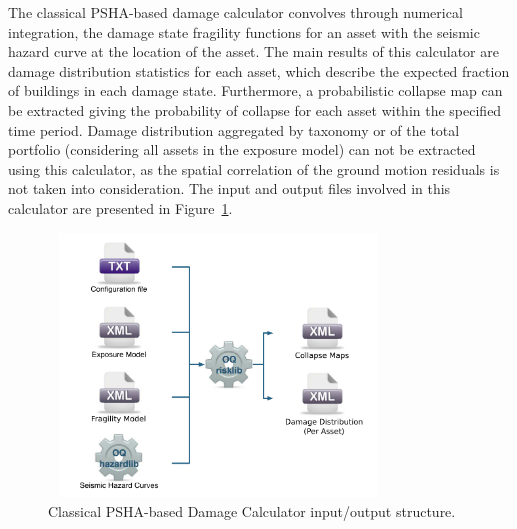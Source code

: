 The classical PSHA-based damage calculator convolves through numerical integration, the damage state fragility functions for an asset with the seismic hazard curve at the location of the asset. The main results of this calculator are damage distribution statistics for each asset, which describe the expected fraction of buildings in each damage state. Furthermore, a probabilistic collapse map can be extracted giving the probability of collapse for each asset within the specified time period. Damage distribution aggregated by taxonomy or of the total portfolio (considering all assets in the exposure model) can not be extracted using this calculator, as the spatial correlation of the ground motion residuals is not taken into consideration. The input and output files involved in this calculator are presented in Figure~\ref{fig:ClassicalDamage}.

\begin{figure}[ht]
\centering
\includegraphics[width=9cm,height=7cm]{figures/risk/ClassicalDamage.pdf}
\caption{Classical PSHA-based Damage Calculator input/output structure.}
\label{fig:ClassicalDamage}
\end{figure}